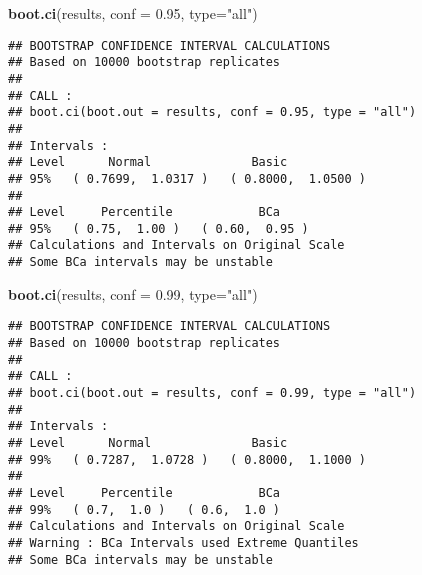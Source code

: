 \documentclass[]{article}
\newenvironment{Shaded}{\begin{snugshade}}{\end{snugshade}}
\newcommand{\KeywordTok}[1]{\textcolor[rgb]{0.13,0.29,0.53}{\textbf{#1}}}
\newcommand{\DataTypeTok}[1]{\textcolor[rgb]{0.13,0.29,0.53}{#1}}
\newcommand{\FloatTok}[1]{\textcolor[rgb]{0.00,0.00,0.81}{#1}}
\newcommand{\StringTok}[1]{\textcolor[rgb]{0.31,0.60,0.02}{#1}}
\newcommand{\OperatorTok}[1]{\textcolor[rgb]{0.81,0.36,0.00}{\textbf{#1}}}
\newcommand{\NormalTok}[1]{#1}
\begin{document}
\begin{Shaded}
\begin{Highlighting}[]
\KeywordTok{boot.ci}\NormalTok{(results, }\DataTypeTok{conf =} \FloatTok{0.95}\NormalTok{, }\DataTypeTok{type=}\StringTok{"all"}\NormalTok{)}
\end{Highlighting}
\end{Shaded}

\begin{verbatim}
## BOOTSTRAP CONFIDENCE INTERVAL CALCULATIONS
## Based on 10000 bootstrap replicates
## 
## CALL : 
## boot.ci(boot.out = results, conf = 0.95, type = "all")
## 
## Intervals : 
## Level      Normal              Basic         
## 95%   ( 0.7699,  1.0317 )   ( 0.8000,  1.0500 )  
## 
## Level     Percentile            BCa          
## 95%   ( 0.75,  1.00 )   ( 0.60,  0.95 )  
## Calculations and Intervals on Original Scale
## Some BCa intervals may be unstable
\end{verbatim}

\begin{Shaded}
\begin{Highlighting}[]
\KeywordTok{boot.ci}\NormalTok{(results, }\DataTypeTok{conf =} \FloatTok{0.99}\NormalTok{, }\DataTypeTok{type=}\StringTok{"all"}\NormalTok{)}
\end{Highlighting}
\end{Shaded}

\begin{verbatim}
## BOOTSTRAP CONFIDENCE INTERVAL CALCULATIONS
## Based on 10000 bootstrap replicates
## 
## CALL : 
## boot.ci(boot.out = results, conf = 0.99, type = "all")
## 
## Intervals : 
## Level      Normal              Basic         
## 99%   ( 0.7287,  1.0728 )   ( 0.8000,  1.1000 )  
## 
## Level     Percentile            BCa          
## 99%   ( 0.7,  1.0 )   ( 0.6,  1.0 )  
## Calculations and Intervals on Original Scale
## Warning : BCa Intervals used Extreme Quantiles
## Some BCa intervals may be unstable
\end{verbatim}

\begin{Shaded}
\end{Shaded}
\end{document}
